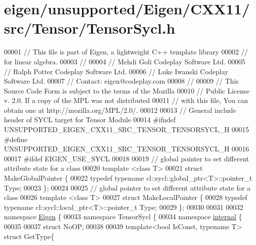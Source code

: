 \hypertarget{eigen_2unsupported_2_eigen_2_c_x_x11_2src_2_tensor_2_tensor_sycl_8h_source}{}\section{eigen/unsupported/\+Eigen/\+C\+X\+X11/src/\+Tensor/\+Tensor\+Sycl.h}
\label{eigen_2unsupported_2_eigen_2_c_x_x11_2src_2_tensor_2_tensor_sycl_8h_source}

\begin{DoxyCode}
00001 \textcolor{comment}{// This file is part of Eigen, a lightweight C++ template library}
00002 \textcolor{comment}{// for linear algebra.}
00003 \textcolor{comment}{//}
00004 \textcolor{comment}{// Mehdi Goli    Codeplay Software Ltd.}
00005 \textcolor{comment}{// Ralph Potter  Codeplay Software Ltd.}
00006 \textcolor{comment}{// Luke Iwanski  Codeplay Software Ltd.}
00007 \textcolor{comment}{// Contact: eigen@codeplay.com}
00008 \textcolor{comment}{//}
00009 \textcolor{comment}{// This Source Code Form is subject to the terms of the Mozilla}
00010 \textcolor{comment}{// Public License v. 2.0. If a copy of the MPL was not distributed}
00011 \textcolor{comment}{// with this file, You can obtain one at http://mozilla.org/MPL/2.0/.}
00012 
00013 \textcolor{comment}{// General include header of SYCL target for Tensor Module}
00014 \textcolor{preprocessor}{#ifndef UNSUPPORTED\_EIGEN\_CXX11\_SRC\_TENSOR\_TENSORSYCL\_H}
00015 \textcolor{preprocessor}{#define UNSUPPORTED\_EIGEN\_CXX11\_SRC\_TENSOR\_TENSORSYCL\_H}
00016 
00017 \textcolor{preprocessor}{#ifdef EIGEN\_USE\_SYCL}
00018 
00019 \textcolor{comment}{// global pointer to set different attribute state for a class}
00020 \textcolor{keyword}{template} <\textcolor{keyword}{class} T>
00021 \textcolor{keyword}{struct }MakeGlobalPointer \{
00022   \textcolor{keyword}{typedef} \textcolor{keyword}{typename} cl::sycl::global\_ptr<T>::pointer\_t Type;
00023 \};
00024 
00025 \textcolor{comment}{// global pointer to set different attribute state for a class}
00026 \textcolor{keyword}{template} <\textcolor{keyword}{class} T>
00027 \textcolor{keyword}{struct }MakeLocalPointer \{
00028   \textcolor{keyword}{typedef} \textcolor{keyword}{typename} cl::sycl::local\_ptr<T>::pointer\_t Type;
00029 \};
00030 
00031 
00032 \textcolor{keyword}{namespace }\hyperlink{namespace_eigen}{Eigen} \{
00033 \textcolor{keyword}{namespace }TensorSycl \{
00034 \textcolor{keyword}{namespace }\hyperlink{namespaceinternal}{internal} \{
00035 
00037   \textcolor{keyword}{struct }NoOP;
00038 
00039 \textcolor{keyword}{template}<\textcolor{keywordtype}{bool} IsConst, \textcolor{keyword}{typename} T> \textcolor{keyword}{struct }GetType\{

\end{DoxyCode}
